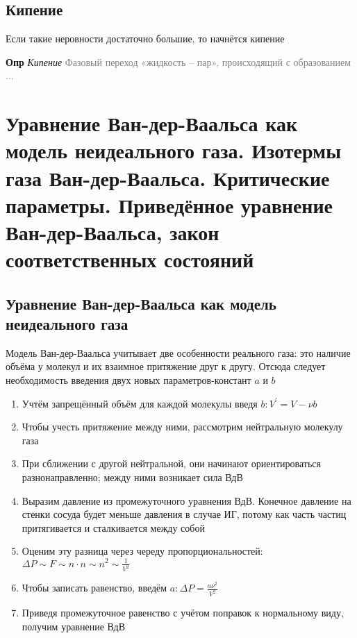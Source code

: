 \documentclass[a4paper, 14pt]{article}
\begin{document}
    \subsection{Кипение}
    
    Если такие неровности достаточно большие, то начнётся кипение
    
    \textbf{Опр} \textit{Кипение} \textcolor{gray}{Фазовый переход «жидкость -- пар», происходящий с образованием ...}
    
    \section{Уравнение Ван-дер-Ваальса как модель неидеального газа.
    Изотермы газа Ван-дер-Ваальса.
    Критические параметры.
    Приведённое уравнение Ван-дер-Ваальса, закон соответственных состояний}
    
    \subsection{Уравнение Ван-дер-Ваальса как модель неидеального газа}
    
    Модель Ван-дер-Ваальса учитывает две особенности реального газа: это наличие объёма у молекул и их взаимное
    притяжение друг к другу.
    Отсюда следует необходимость введения двух новых параметров-констант $a$ и $b$
    
    \begin{enumerate}
        \item Учтём запрещённый объём для каждой молекулы введя $b: V^{'} = V - \nu b$
        \item Чтобы учесть притяжение между ними, рассмотрим нейтральную молекулу газа
        \item При сближении с другой нейтральной, они начинают ориентироваться разнонаправленно; между ними возникает
        сила ВдВ
        \item Выразим давление из промежуточного уравнения ВдВ.
        Конечное давление на стенки сосуда будет меньше давления в случае ИГ, потому как часть частиц притягивается и
        сталкивается между собой
        \item Оценим эту разница через череду пропорциональностей: $\Delta P \sim F \sim n \cdot n \sim n^2 \sim \frac{1}{V^2}$
        \item Чтобы записать равенство, введём $a: \Delta P = \frac{a \nu^2}{V^2}$
        \item Приведя промежуточное равенство с учётом поправок к нормальному виду, получим уравнение ВдВ
    \end{enumerate}
    
\end{document}
